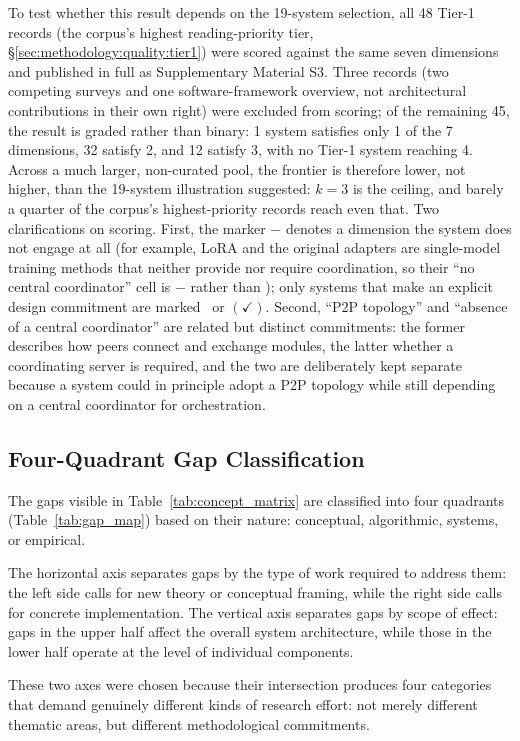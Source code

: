 To test whether this result depends on the 19-system selection, all 48 Tier-1 records (the corpus's highest reading-priority tier, \S\ref{sec:methodology:quality:tier1}) were scored against the same seven dimensions and published in full as Supplementary Material S3. Three records (two competing surveys and one software-framework overview, not architectural contributions in their own right) were excluded from scoring; of the remaining 45, the result is graded rather than binary: 1 system satisfies only 1 of the 7 dimensions, 32 satisfy 2, and 12 satisfy 3, with no Tier-1 system reaching 4. Across a much larger, non-curated pool, the frontier is therefore lower, not higher, than the 19-system illustration suggested: $k=3$ is the ceiling, and barely a quarter of the corpus's highest-priority records reach even that. Two clarifications on scoring. First, the marker $-$ denotes a dimension the system does not engage at all (for example, LoRA and the original adapters are single-model training methods that neither provide nor require coordination, so their ``no central coordinator'' cell is $-$ rather than \checkmark); only systems that make an explicit design commitment are marked \checkmark\ or $(\checkmark)$. Second, ``P2P topology'' and ``absence of a central coordinator'' are related but distinct commitments: the former describes how peers connect and exchange modules, the latter whether a coordinating server is required, and the two are deliberately kept separate because a system could in principle adopt a P2P topology while still depending on a central coordinator for orchestration.

\subsection{Four-Quadrant Gap Classification}
\label{sec:synthesis_gap:gaps}

The gaps visible in Table~\ref{tab:concept_matrix} are classified into four quadrants
(Table~\ref{tab:gap_map}) based on their nature: conceptual, algorithmic,
systems, or empirical.

The horizontal axis separates gaps by the type of work required to address them: the left side calls for new theory or conceptual framing, while the right side calls for concrete implementation. The vertical axis separates gaps by scope of effect: gaps in the upper half affect the overall system architecture, while those in the lower half operate at the level of individual components.

These two axes were chosen because their intersection produces four categories that demand genuinely different kinds of research effort: not merely different thematic areas, but different methodological commitments.

